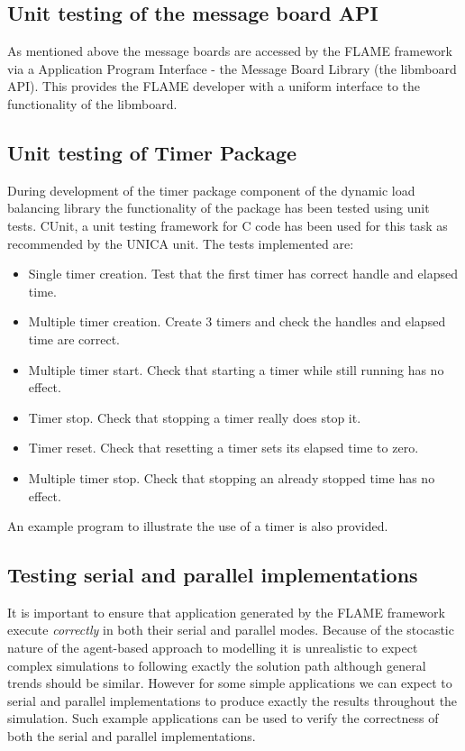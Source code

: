 \subsection{Unit testing of the message board API}
As mentioned above the message boards are accessed by the FLAME framework via a Application Program Interface - the Message Board Library (the libmboard API). This provides the FLAME developer with a uniform interface to the functionality of the libmboard.

\subsection{Unit testing of Timer Package}

During development of the timer package component of the dynamic load balancing library the functionality of the package has been tested using unit tests. CUnit, a unit testing framework for C code has been used for this task as recommended by the UNICA unit. The tests implemented are:

\begin{itemize}
	\item Single timer creation. Test that the first timer has correct handle and elapsed time.
	\item Multiple timer creation. Create 3 timers and check the handles and elapsed time are correct.
	\item Multiple timer start. Check that starting a timer while still running has no effect.
	\item Timer stop. Check that stopping a timer really does stop it.
	\item Timer reset. Check that resetting a timer sets its elapsed time to zero.
	\item Multiple timer stop. Check that stopping an already stopped time has no effect.
\end{itemize}

An example program to illustrate the use of a timer is also provided.

\subsection{Testing serial and parallel implementations}
It is important to ensure that application generated by the FLAME framework execute \textsl{correctly} in both their serial and parallel modes. Because of the stocastic nature of the agent-based approach to modelling it is unrealistic to expect complex simulations to following exactly the solution path although general trends should be similar. However for some simple applications we can expect to serial and parallel implementations to produce exactly the results throughout the simulation. Such example applications can be used to verify the correctness of both the serial and parallel implementations.

